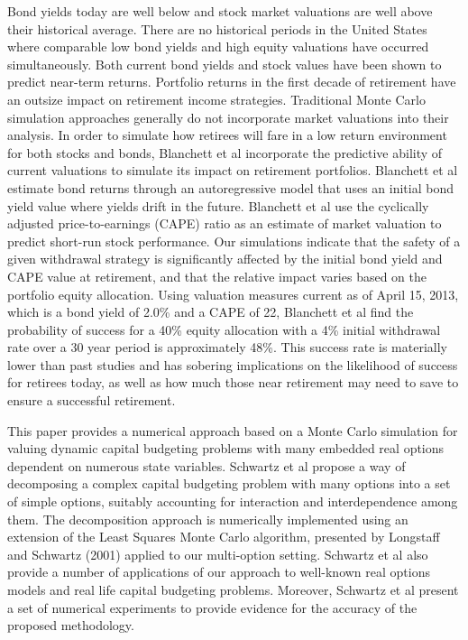 Bond yields today are well below and stock market valuations are well above their historical average.\cite{Blanchett:2013aa} There are no historical periods in the United States where comparable low bond yields and high equity valuations have occurred simultaneously. Both current bond yields and stock values have been shown to predict near-term returns. Portfolio returns in the first decade of retirement have an outsize impact on retirement income strategies. Traditional Monte Carlo simulation approaches generally do not incorporate market valuations into their analysis. In order to simulate how retirees will fare in a low return environment for both stocks and bonds, Blanchett et al incorporate the predictive ability of current valuations to simulate its impact on retirement portfolios. Blanchett et al estimate bond returns through an autoregressive model that uses an initial bond yield value where yields drift in the future. Blanchett et al use the cyclically adjusted price-to-earnings (CAPE) ratio as an estimate of market valuation to predict short-run stock performance. Our simulations indicate that the safety of a given withdrawal strategy is significantly affected by the initial bond yield and CAPE value at retirement, and that the relative impact varies based on the portfolio equity allocation. Using valuation measures current as of April 15, 2013, which is a bond yield of 2.0\% and a CAPE of 22, Blanchett et al find the probability of success for a 40\% equity allocation with a 4\% initial withdrawal rate over a 30 year period is approximately 48\%. This success rate is materially lower than past studies and has sobering implications on the likelihood of success for retirees today, as well as how much those near retirement may need to save to ensure a successful retirement.

This paper provides a numerical approach based on a Monte Carlo simulation for valuing dynamic capital budgeting problems with many embedded real options dependent on numerous state variables.\cite{Gamba:2003aa} Schwartz et al propose a way of decomposing a complex capital budgeting problem with many options into a set of simple options, suitably accounting for interaction and interdependence among them. The decomposition approach is numerically implemented using an extension of the Least Squares Monte Carlo algorithm, presented by Longstaff and Schwartz (2001) applied to our multi-option setting. Schwartz et al also provide a number of applications of our approach to well-known real options models and real life capital budgeting problems. Moreover, Schwartz et al present a set of numerical experiments to provide evidence for the accuracy of the proposed methodology.

